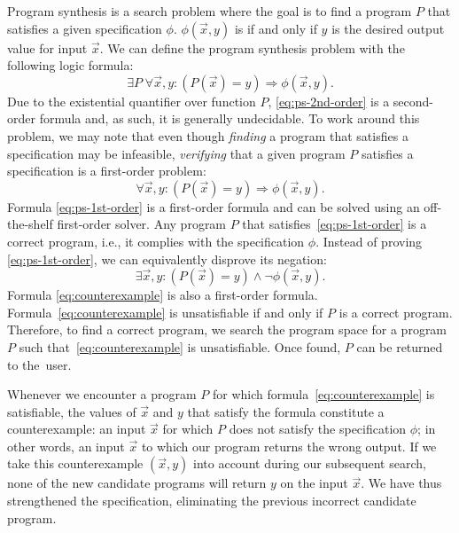 Program synthesis is a search problem where the goal is to find a program \(P\) that satisfies a given specification \(\phi\).
\(\phi(\vec{x}, y)\) is \true{} if and only if \(y\) is the desired output value for input \(\vec{x}\).
We can define the program synthesis problem with the following logic formula:
%
\begin{equation}\label{eq:ps-2nd-order}
\exists P \; \forall \vec{x}, y : (P(\vec{x}) = y) \Rightarrow \phi(\vec{x}, y).
\end{equation}
%
\noindent
Due to the existential quantifier over function \(P\), \eqref{eq:ps-2nd-order} is a second-order formula and, as such, it is generally undecidable. 
To work around this problem, we may note that even though \textit{finding} a program that satisfies a specification may be infeasible, \textit{verifying} that a given program \(P\) satisfies a specification is a first-order problem:
%
\begin{equation}\label{eq:ps-1st-order}
\forall \vec{x}, y : (P(\vec{x}) = y) \Rightarrow \phi(\vec{x}, y).
\end{equation}
%
Formula \eqref{eq:ps-1st-order} is a first-order formula and can be solved using an off-the-shelf first-order solver. Any program \(P\) that satisfies~\eqref{eq:ps-1st-order} is a correct program, i.e., it complies with the specification \(\phi\).
Instead of proving \eqref{eq:ps-1st-order}, we can equivalently disprove its negation:
%
\begin{equation}\label{eq:counterexample}
\exists \vec{x}, y : (P(\vec{x}) = y) \wedge \neg \phi(\vec{x}, y).
\end{equation}
%
Formula \eqref{eq:counterexample} is also a first-order formula.
Formula~\eqref{eq:counterexample} is unsatisfiable if and only if \(P\) is a correct program.
Therefore, to find a correct program, we search the program space for a program \(P\) such that~\eqref{eq:counterexample} is unsatisfiable. Once found, \(P\) can be returned to the~user. %



Whenever we encounter a program \(P\) for which formula~\eqref{eq:counterexample} is satisfiable, the values of \(\vec{x}\) and \(y\) that satisfy the formula constitute a counterexample: an input \(\vec{x}\) for which \(P\) does not satisfy the specification \(\phi\); in other words, an input \(\vec{x}\) to which our program returns the wrong output.
If we take this counterexample \((\vec{x}, y)\) into account during our subsequent search, none of the new candidate programs will return \(y\) on the input \(\vec{x}\).
We have thus strengthened the specification, eliminating the previous incorrect candidate program.

